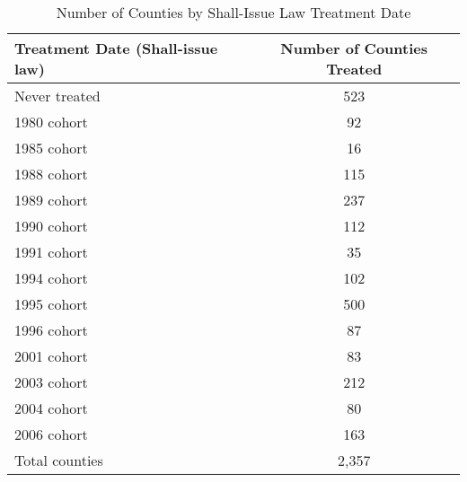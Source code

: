 \begin{table}[htbp]\centering
\caption{Number of Counties by Shall-Issue Law Treatment Date}\label{tab:countybycohort}
\begin{tabular}{lc}
\toprule
\textbf{Treatment Date (Shall-issue law)} & \textbf{Number of Counties Treated} \\
\midrule
Never treated&         523\\
1980 cohort &          92\\
1985 cohort &          16\\
1988 cohort &         115\\
1989 cohort &         237\\
1990 cohort &         112\\
1991 cohort &          35\\
1994 cohort &         102\\
1995 cohort &         500\\
1996 cohort &          87\\
2001 cohort &          83\\
2003 cohort &         212\\
2004 cohort &          80\\
2006 cohort &         163\\
\midrule
Total counties &     2,357 \\
\bottomrule
\end{tabular}
\end{table}
